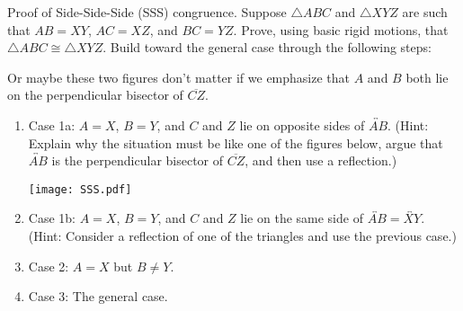 \documentclass[nooutcomes]{ximera}
\begin{document}
\newpage

\begin{problem}
Proof of Side-Side-Side (SSS) congruence.  Suppose $\triangle ABC$ and $\triangle XYZ$ are such that $AB=XY$, $AC=XZ$, and $BC=YZ$.  Prove, using basic rigid motions, that $\triangle ABC \cong \triangle XYZ$.  Build toward the general case through the following steps:  
\begin{teachingnote}
Or maybe these two figures don't matter if we emphasize that $A$ and $B$ both lie on the perpendicular bisector of $\overline{CZ}$.
\end{teachingnote}
\begin{enumerate}
\item Case 1a:  $A=X$, $B=Y$, and $C$ and $Z$ lie on opposite sides of $\overleftrightarrow{AB}$.  (Hint:  Explain why the situation must be like one of the figures below, argue that $\overleftrightarrow{AB}$ is the perpendicular bisector of $\overline{CZ}$, and then use a reflection.)
\begin{image}
\texttt{[image: SSS.pdf]}
\end{image}
\item Case 1b:  $A=X$, $B=Y$, and $C$ and $Z$ lie on the same side of $\overleftrightarrow{AB}=\overleftrightarrow{XY}$.  (Hint: Consider a reflection of one of the triangles and use the previous case.)  
\item Case 2:  $A=X$ but $B \ne Y$.
\item Case 3: The general case.  
\end{enumerate}
\vfill
\end{problem}
\end{document}
